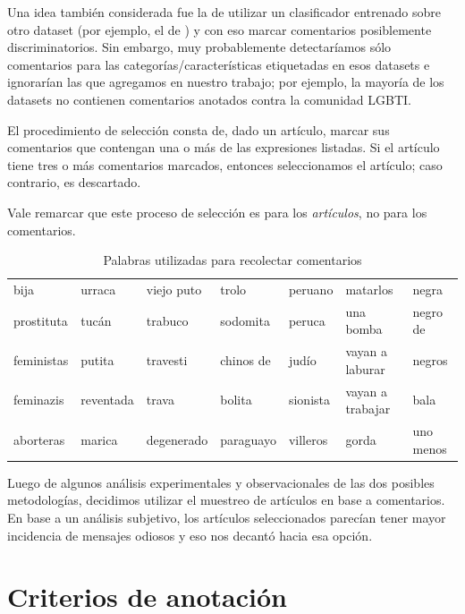Una idea también considerada fue la de utilizar un clasificador entrenado sobre otro dataset (por ejemplo, el de \citet{hateval2019semeval}) y con eso marcar comentarios posiblemente discriminatorios. Sin embargo, muy probablemente detectaríamos sólo comentarios para las categorías/características etiquetadas en esos datasets e ignorarían las que agregamos en nuestro trabajo; por ejemplo, la mayoría de los datasets no contienen comentarios anotados contra la comunidad LGBTI.

El procedimiento de selección consta de, dado un artículo, marcar sus comentarios que contengan una o más de las expresiones listadas. Si el artículo tiene tres o más comentarios marcados, entonces seleccionamos el artículo; caso contrario, es descartado.


Vale remarcar que este proceso de selección es para los \emph{artículos}, no para los comentarios.

\begin{table}[t!]
    \centering
    \begin{tabular}{l|l|l|l|l|l|l}
    bija          & urraca     & viejo puto    & trolo      & peruano  & matarlos         & negra      \\
    prostituta    & tucán      & trabuco       & sodomita   & peruca   & una bomba        & negro de   \\
    feministas    & putita     & travesti      & chinos de  & judío    & vayan a laburar  & negros     \\
    feminazis     & reventada  & trava         & bolita     & sionista & vayan a trabajar & bala       \\
    aborteras     & marica     & degenerado    & paraguayo  & villeros & gorda            & uno menos  \\
    \end{tabular}
    \caption{Palabras utilizadas para recolectar comentarios}
    \label{tab:palabras_comentarios}
\end{table}

Luego de algunos análisis experimentales y observacionales de las dos posibles metodologías, decidimos utilizar el muestreo de artículos en base a comentarios. En base a un análisis subjetivo, los artículos seleccionados parecían tener mayor incidencia de mensajes odiosos y eso nos decantó hacia esa opción.

\section{Criterios de anotación}
\label{sec:criterios}


